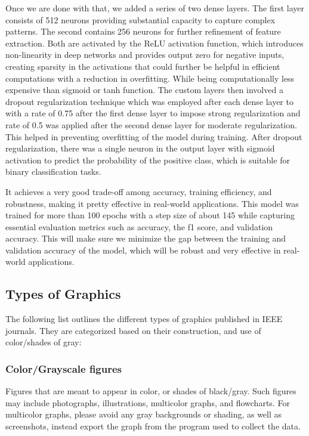 \documentclass{ieeeaccess}
\begin{document}
Once we are done with that, we added a series of two dense layers. The first layer consists of 512 neurons providing substantial capacity to capture complex patterns. The second contains 256 neurons for further refinement of feature extraction. Both are activated by the ReLU activation function, which introduces non-linearity in deep networks and provides output zero for negative inputs, creating sparsity in the activations that could further be helpful in efficient computations with a reduction in overfitting. While being computationally less expensive than sigmoid or tanh function. The custom layers then involved a dropout regularization technique which was employed after each dense layer to with a rate of 0.75 after the first dense layer to impose strong regularization and rate of 0.5 was applied after the second dense layer for moderate regularization. This helped in preventing overfitting of the model during training. After dropout regularization, there was a single neuron in the output layer with sigmoid activation to predict the probability of the positive class, which is suitable for binary classification tasks.

It achieves a very good trade-off among accuracy, training efficiency, and robustness, making it pretty effective in real-world applications. This model was trained for more than 100 epochs with a step size of about 145 while capturing essential evaluation metrics such as accuracy, the f1 score, and validation accuracy. This will make sure we minimize the gap between the training and validation accuracy of the model, which will be robust and very effective in real-world applications.




\subsection{Types of Graphics}
The following list outlines the different types of graphics published in
IEEE journals. They are categorized based on their construction, and use of
color/shades of gray:

\subsubsection{Color/Grayscale figures}
{Figures that are meant to appear in color, or shades of black/gray. Such
figures may include photographs, illustrations, multicolor graphs, and
flowcharts. For multicolor graphs, please avoid any gray backgrounds or shading, as well as screenshots, instead export the graph from the program used to collect the data.}
\end{document}
